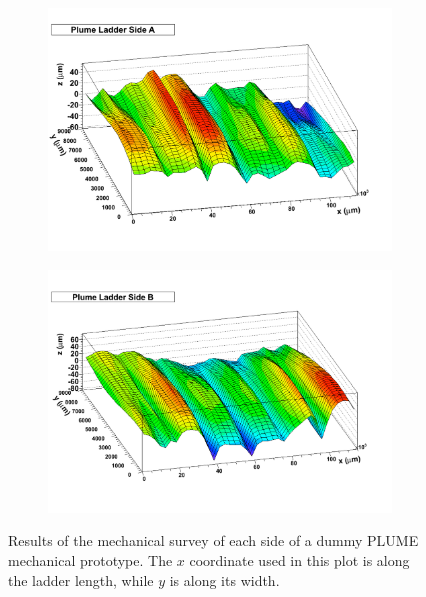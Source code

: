       \begin{figure}[!tbh]
        \centering
        \begin{subfigure}[t]{0.45\textwidth}
          \centering
          \includegraphics[width = 1.2\textwidth]{Pictures/deformation/surveyResults.pdf}
        \end{subfigure}
        \hfill
        \begin{subfigure}[t]{0.45\textwidth}
          \centering
          \includegraphics[width = 1.2\textwidth]{Pictures/deformation/surveyResultsB.pdf}
        \end{subfigure}

        \caption{Results of the mechanical survey of each side of a dummy PLUME mechanical prototype. The $x$ coordinate used in this plot is along the ladder length, while $y$ is along its width.}
        \label{fig:mechanicalSurvey}
      \end{figure}


